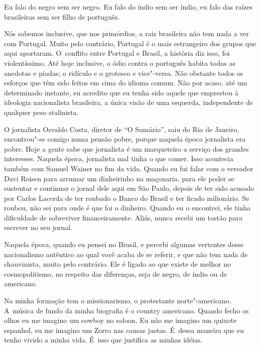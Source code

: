 Eu falo do negro sem ser negro. Eu falo do índio sem ser índio, eu falo
das raízes brasileiras sem ser filho de português.

 

Nós sabemos inclusive, que nos primórdios, a raiz brasileira não tem
nada a ver com Portugal. Muito pelo contrário, Portugal é o mais
estrangeiro dos grupos que aqui aportaram. O~conflito entre Portugal e
Brasil, a história diz isso, foi violentíssimo. Até hoje inclusive, o
ódio contra o português habita todas as anedotas e piadas; o ridículo e
o grotesco e vice"-versa. Não obstante todos os esforços que têm sido
feitos em cima do idioma comum. Não por acaso, até um determinado
instante, eu acredito que eu tenha sido aquele que emprestou à ideologia
nacionalista brasileira, a única visão de uma esquerda, independente de
qualquer peso stalinista.

 

O jornalista Osvaldo Costa, diretor de ``O Sumário'', saiu do Rio de
Janeiro, encontrou"-se comigo numa pensão pobre, porque naquela época
jornalista era pobre. Hoje a gente sabe que jornalista é um marqueteiro
a serviço dos grandes interesses. Naquela época, jornalista mal tinha o
que comer. Isso acontecia também com Samuel Wainer no fim da vida.
Quando eu fui falar com o vereador Davi Roisen para arrumar um
dinheirinho na maçonaria, para ele poder se sustentar e continuar o
jornal dele aqui em São Paulo, depois de ter sido acusado por
Carlos Lacerda de ter roubado o Banco do Brasil e ter ficado milionário.
Se roubou, não sei para onde é que foi o dinheiro. Quando eu o
encontrei, ele tinha dificuldade de sobreviver financeiramente. Aliás,
nunca recebi um tostão para escrever no seu jornal.

 

Naquela época, quando eu pensei no Brasil, e percebi algumas vertentes
desse nacionalismo autêntico ao qual você acaba de se referir, e que não
tem nada de chauvinista, muito pelo contrário. Ele é ligado ao que
existe de melhor no cosmopolitismo, no respeito das diferenças, seja de
negro, de índio ou de americano.

 

Na minha formação tem o missionarismo, o protestante norte"-americano. A~música de fundo da minha biografia é o country americano. Quando fecho
os olhos eu me imagino um cowboy no saloon. Eu não me imagino um quixote
espanhol, eu me imagino um Zorro nas causas justas. É~dessa maneira que
eu tenho vivido a minha vida. É~isso que justifica as minhas idéias.

